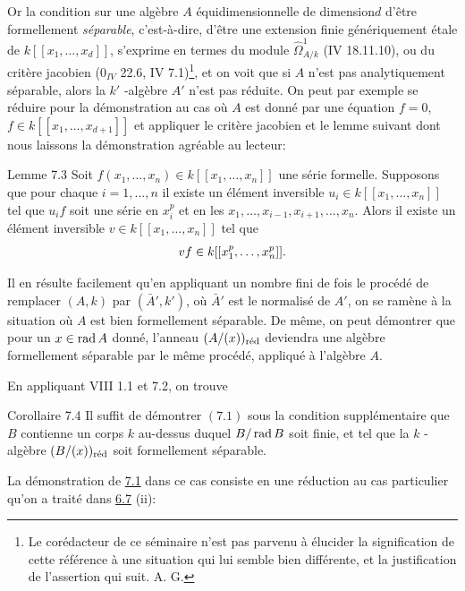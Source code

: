 \documentclass[10pt]{../fichiers-configuration-latex/smfart}
\begin{document}
Or la condition sur une algèbre $A$ équidimensionnelle de
dimension\pageoriginale $d$ d'être formellement \emph{séparable},
c'est-à-dire, d'être une extension finie génériquement étale de
$k[[x_{1},\ldots, x_{d}]]$, s'exprime en termes du module
$\widehat{\Omega}^{1}_{A/k}$ (\EGA IV 18.11.10), ou du critère
jacobien (\EGA $0_{IV}$ 22.6, IV 7.1)\footnote[1]{Le corédacteur de ce
séminaire n'est pas parvenu à élucider la signification de cette
référence à une situation qui lui semble bien différente, et la
justification de l'assertion qui suit. A. G.}, et on voit que si $A$
n'est pas analytiquement séparable, alors la $k'$ -algèbre $A'$ n'est
pas réduite. On peut par exemple se réduire pour la démonstration au
cas où $A$ est donné par une équation $f=0$, $f\in k[[x_{1},\ldots,
x_{d+1}]]$ et appliquer le critère jacobien et le lemme suivant dont
nous laissons la démonstration agréable au lecteur:

\begin{enonce*}{Lemme 7.3}
Soit $f(x_{1},\ldots,x_{n})\in k[[x_{1},\ldots,x_{n}]]$ une série
formelle. Supposons que pour chaque $i=1,\ldots,n$ il existe un
élément inversible $u_{i}\in k[[x_{1},\ldots,x_{n}]]$ tel que $u_{i}f$
soit une série en $x_{i}^{p}$ et en les
$x_{1},\ldots,x_{i-1},x_{i+1},\ldots,x_{n}$. Alors il existe un
élément inversible $v\in k[[x_{1},\ldots,x_{n}]]$ tel que
$$
vf\in k[[x_{1}^{p},\dots,x_{n}^{p}]]{}.
$$
\end{enonce*}

Il en résulte facilement qu'en appliquant un nombre fini de fois le
procédé de remplacer $(A,k)$ par $(\bar{A}',k')$, où $\bar{A}'$ est le
normalisé de $A'$, on se ramène à la situation où $A$ est bien
formellement séparable. De même, on peut démontrer que pour un $x\in
\operatorname{rad} A$ donné, l'anneau $(A/(x))_{\text{\rm réd}}$ deviendra une
algèbre formellement séparable par le même procédé, appliqué à
l'algèbre $A$.

En appliquant VIII 1.1 et 7.2, on trouve

\begin{enonce*}{Corollaire 7.4}
Il suffit de démontrer $(7.1)$ sous la condition supplémentaire que
$B$ contienne un corps $k$ au-dessus duquel $B/\operatorname{rad} B$ soit finie, et
tel que la $k$ -algèbre $(B/(x))_{\text{\rm réd}}$ soit formellement
séparable.\pageoriginale
\end{enonce*}
 
La démonstration de \hyperref[XIX.lem7.1]{7.1} dans ce cas consiste en une
réduction au cas 
particulier qu'on a traité dans \hyperref[XIX.lem6.7]{6.7}  (ii):
\end{document}
